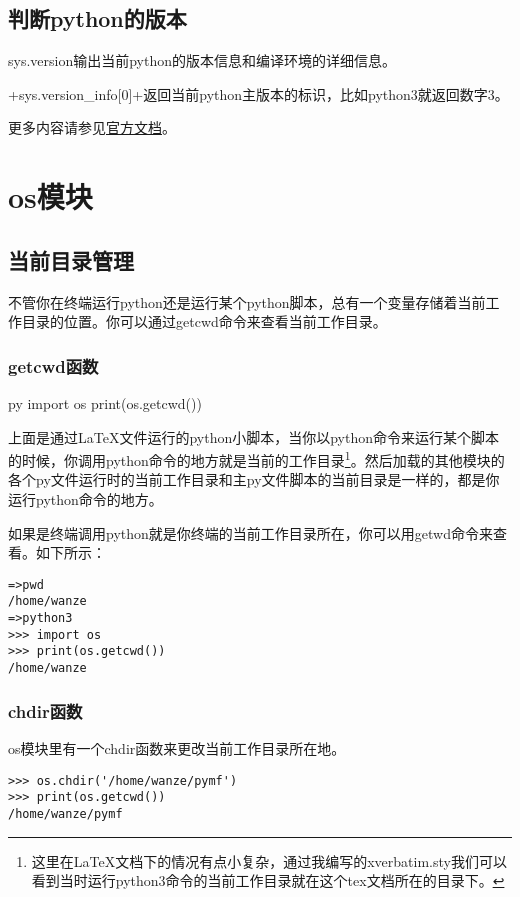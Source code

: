 \documentclass[12pt,oneside]{book}
\begin{document}
\begin{common-format}
\section{判断python的版本}
sys.version输出当前python的版本信息和编译环境的详细信息。

+sys.version_info[0]+返回当前python主版本的标识，比如python3就返回数字3。


\begin{Large}
更多内容请参见\href{https://docs.python.org/3/library/sys.html}{官方文档}。
\end{Large}


\chapter{os模块}
\section{当前目录管理}
不管你在终端运行python还是运行某个python脚本，总有一个变量存储着当前工作目录的位置。你可以通过getcwd命令来查看当前工作目录。
\subsection{getcwd函数}
\begin{xverbatim}[129]{py}
import os
print(os.getcwd())
\end{xverbatim}
上面是通过\LaTeX 文件运行的python小脚本，当你以python命令来运行某个脚本的时候，你调用python命令的地方就是当前的工作目录\footnote{这里在\LaTeX 文档下的情况有点小复杂，通过我编写的xverbatim.sty我们可以看到当时运行python3命令的当前工作目录就在这个tex文档所在的目录下。}。然后加载的其他模块的各个py文件运行时的当前工作目录和主py文件脚本的当前目录是一样的，都是你运行python命令的地方。

如果是终端调用python就是你终端的当前工作目录所在，你可以用getwd命令来查看。如下所示：
\begin{Verbatim}
=>pwd
/home/wanze
=>python3
>>> import os
>>> print(os.getcwd())
/home/wanze
\end{Verbatim}

\subsection{chdir函数}
os模块里有一个chdir函数来更改当前工作目录所在地。
\begin{Verbatim}
>>> os.chdir('/home/wanze/pymf')
>>> print(os.getcwd())
/home/wanze/pymf
\end{Verbatim}



\end{common-format}
\end{document}
